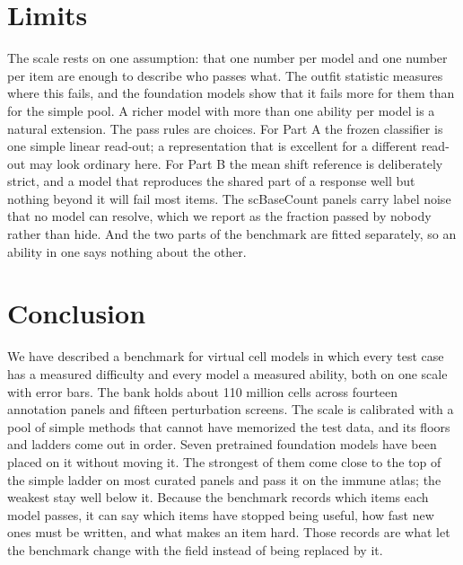\documentclass[]{style}
\begin{document}
\section{Limits}
\label{sec:limits}

The scale rests on one assumption: that one number per model and one number per item are
enough to describe who passes what. The outfit statistic measures where this fails, and
the foundation models show that it fails more for them than for the simple pool. A richer
model with more than one ability per model is a natural extension. The pass rules are
choices. For Part A the frozen classifier is one simple linear read-out; a representation
that is excellent for a different read-out may look ordinary here. For Part B the mean
shift reference is deliberately strict, and a model that reproduces the shared part of a
response well but nothing beyond it will fail most items. The scBaseCount panels carry
label noise that no model can resolve, which we report as the fraction passed by nobody
rather than hide. And the two parts of the benchmark are fitted separately, so an ability
in one says nothing about the other.

\section{Conclusion}
\label{sec:conclusion}

We have described a benchmark for virtual cell models in which every test case has a
measured difficulty and every model a measured ability, both on one scale with error bars.
The bank holds about 110 million cells across fourteen annotation panels and fifteen
perturbation screens. The scale is calibrated with a pool of simple methods that cannot
have memorized the test data, and its floors and ladders come out in order. Seven
pretrained foundation models have been placed on it without moving it. The strongest
of them come close to the top of the simple ladder on most curated panels and pass it on
the immune atlas; the weakest stay well below it. Because the benchmark records which items each model passes, it can say which
items have stopped being useful, how fast new ones must be written, and what makes an
item hard. Those records are what let the benchmark change with the field instead of
being replaced by it.



\end{document}
